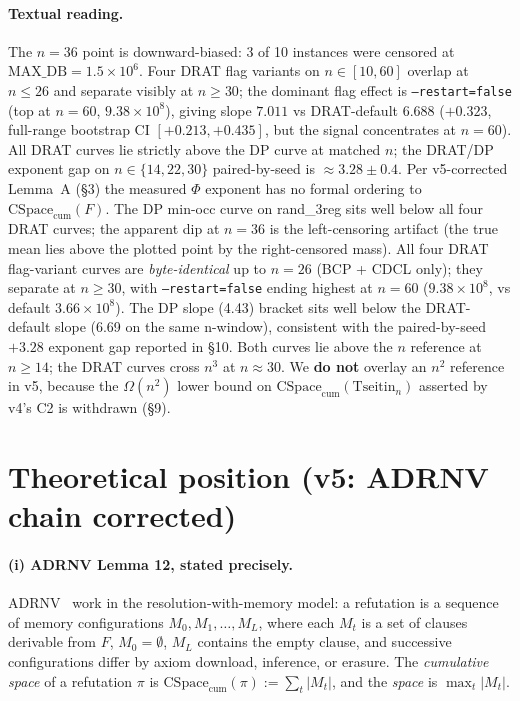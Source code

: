 \documentclass[11pt,a4paper]{article}
\theoremstyle{remark}
\begin{document}
\paragraph{Textual reading.}
{\sloppy
The $n=36$ point is downward-biased: 3 of 10 instances were censored at
$\mathrm{MAX\_DB} = 1.5 \times 10^6$. Four DRAT flag variants on
$n \in [10,60]$ overlap at $n \le 26$ and separate visibly at $n \ge 30$;
the dominant flag effect is \texttt{--restart=false} (top at $n=60$,
$9.38 \times 10^8$), giving slope $7.011$ vs DRAT-default $6.688$
($+0.323$, full-range bootstrap CI $[+0.213, +0.435]$, but the signal
concentrates at $n=60$). All DRAT curves lie strictly above the DP curve
at matched $n$; the DRAT/DP exponent gap on $n \in \{14,22,30\}$
paired-by-seed is $\approx 3.28 \pm 0.4$. Per v5-corrected Lemma~A
(\S3) the measured $\Phi$ exponent has no formal ordering to
$\mathrm{CSpace}_{\mathrm{cum}}(F)$. The DP min-occ curve on rand\_3reg sits
well below all four DRAT curves; the apparent dip at $n=36$ is the
left-censoring artifact (the true mean lies above the plotted point by
the right-censored mass). All four DRAT flag-variant curves are
\emph{byte-identical} up to $n=26$ (BCP + CDCL only); they separate at
$n \ge 30$, with \texttt{--restart=false} ending highest at $n=60$
($9.38 \times 10^8$, vs default $3.66 \times 10^8$). The DP slope (4.43)
bracket sits well below the DRAT-default slope (6.69 on the same
n-window), consistent with the paired-by-seed $+3.28$ exponent gap
reported in \S10. Both curves lie above the $n$ reference at $n \ge 14$;
the DRAT curves cross $n^3$ at $n \approx 30$. We \textbf{do not} overlay
an $n^2$ reference in v5, because the $\Omega(n^2)$ lower bound on
$\mathrm{CSpace}_{\mathrm{cum}}(\mathrm{Tseitin}_n)$ asserted by v4's C2
is withdrawn (\S9).

\clearpage
\section{Theoretical position (v5: ADRNV chain corrected)}

\paragraph{(i) ADRNV Lemma 12, stated precisely.} ADRNV~\cite{ADRNV2017}
work in the resolution-with-memory model: a refutation is a sequence of
memory configurations $M_0, M_1, \ldots, M_L$, where each $M_t$ is a set
of clauses derivable from $F$, $M_0 = \emptyset$, $M_L$ contains the empty
clause, and successive configurations differ by axiom download, inference,
or erasure. The \emph{cumulative space} of a refutation $\pi$ is
$\mathrm{CSpace}_{\mathrm{cum}}(\pi) := \sum_t |M_t|$, and the
\emph{space} is $\max_t |M_t|$.

}
\end{document}
